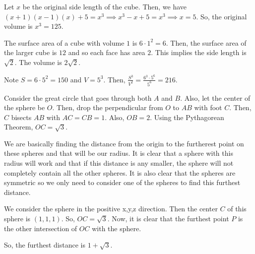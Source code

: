 \documentclass[11pt]{article}
\begin{document}
\begin{sol}
Let $x$ be the original side length of the cube. Then, we have $(x+1)(x-1)(x)+5=x^3\implies x^3-x+5=x^3\implies x=5$. So, the original volume is $x^3=\boxed{125}$.
\end{sol}


\begin{sol}
The surface area of a cube with volume $1$ is $6\cdot 1^2=6$. Then, the surface area of the larger cube is $12$ and so each face has area $2$. This implies the side length is $\sqrt{2}$. The volume is $2\sqrt{2}$.
\end{sol}


\begin{sol}
Note $S=6\cdot 5^2=150$ and $V=5^3$. Then, $\frac{S^3}{V^2}=\frac{6^3\cdot 5^6}{5^6}=\boxed{216}$.
\end{sol}


\begin{sol}
Consider the great circle that goes through both $A$ and $B$. Also, let the center of the sphere be $O$. Then, drop the perpendicular from $O$ to $AB$ with foot $C$. Then, $C$ bisects $AB$ with $AC=CB=1$. Also, $OB=2$. Using the Pythagorean Theorem, $OC=\boxed{\sqrt{3}}$.
\end{sol}


\begin{sol}
We are basically finding the distance from the origin to the furtherest point on these spheres and that will be our radius. It is clear that a sphere with this radius will work and that if this distance is any smaller, the sphere will not completely contain all the other spheres. It is also clear that the spheres are symmetric so we only need to consider one of the spheres to find this furthest distance.  

We consider the sphere in the positive x,y,z direction. Then the center $C$ of this sphere is $(1,1,1)$. So, $OC=\sqrt{3}$. Now, it is clear that the furthest point $P$ is the other intersection of $OC$ with the sphere. 

So, the furthest distance is $\boxed{1+\sqrt{3}}$.
\end{sol}
\end{document}
